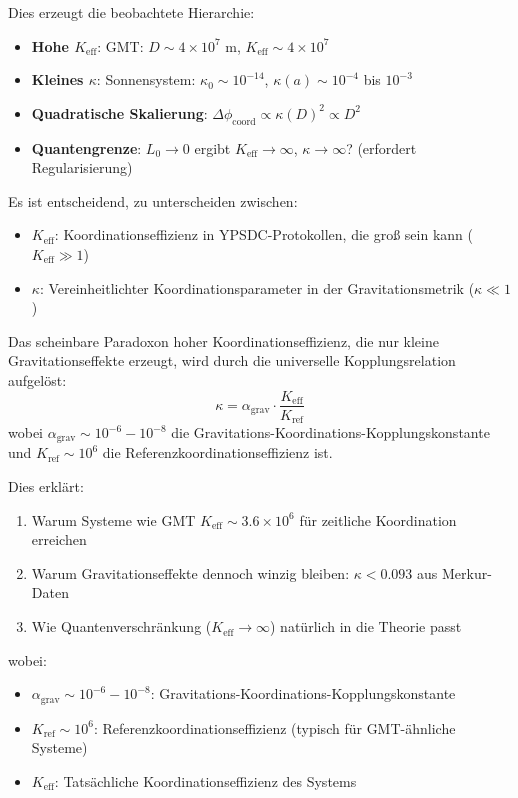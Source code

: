 \documentclass[11pt,a4paper]{article}
\begin{document}
	Dies erzeugt die beobachtete Hierarchie:
	\begin{itemize}
		\item \textbf{Hohe $K_{\mathrm{eff}}$}: GMT: $D \sim 4\times10^7$ m, $K_{\mathrm{eff}} \sim 4\times10^7$
		\item \textbf{Kleines $\kappa$}: Sonnensystem: $\kappa_0 \sim 10^{-14}$, $\kappa(a) \sim 10^{-4}$ bis $10^{-3}$
		\item \textbf{Quadratische Skalierung}: $\Delta\phi_{\text{coord}} \propto \kappa(D)^2 \propto D^2$
		\item \textbf{Quantengrenze}: $L_0 \to 0$ ergibt $K_{\mathrm{eff}} \to \infty$, $\kappa \to \infty$? (erfordert Regularisierung)
	\end{itemize}
	
	Es ist entscheidend, zu unterscheiden zwischen:
	\begin{itemize}
		\item \textbf{$K_{\mathrm{eff}}$}: Koordinationseffizienz in YPSDC-Protokollen, die groß sein kann ($K_{\mathrm{eff}} \gg 1$)
		\item \textbf{$\kappa$}: Vereinheitlichter Koordinationsparameter in der Gravitationsmetrik ($\kappa \ll 1$)
	\end{itemize}
	
	Das scheinbare Paradoxon hoher Koordinationseffizienz, die nur kleine Gravitationseffekte erzeugt, wird durch die universelle Kopplungsrelation aufgelöst:
	\begin{equation}
		\boxed{\kappa = \alpha_{\text{grav}} \cdot \frac{K_{\mathrm{eff}}}{K_{\text{ref}}}}
	\end{equation}
	wobei $\alpha_{\text{grav}} \sim 10^{-6} - 10^{-8}$ die Gravitations-Koordinations-Kopplungskonstante und $K_{\text{ref}} \sim 10^6$ die Referenzkoordinationseffizienz ist.
	
	Dies erklärt:
	\begin{enumerate}
		\item Warum Systeme wie GMT $K_{\mathrm{eff}} \sim 3.6\times10^6$ für zeitliche Koordination erreichen
		\item Warum Gravitationseffekte dennoch winzig bleiben: $\kappa < 0.093$ aus Merkur-Daten
		\item Wie Quantenverschränkung ($K_{\mathrm{eff}} \to \infty$) natürlich in die Theorie passt
	\end{enumerate}
	wobei:
	\begin{itemize}
		\item $\alpha_{\text{grav}} \sim 10^{-6} - 10^{-8}$: Gravitations-Koordinations-Kopplungskonstante
		\item $K_{\text{ref}} \sim 10^6$: Referenzkoordinationseffizienz (typisch für GMT-ähnliche Systeme)
		\item $K_{\mathrm{eff}}$: Tatsächliche Koordinationseffizienz des Systems
	\end{itemize}
	
\end{document}
